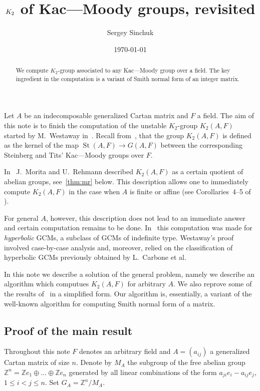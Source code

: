 \documentclass[oneside, 10pt]{amsart}
\title{$\K$ of Kac---Moody groups, revisited}
\author {Sergey Sinchuk}
\date {\today}
\theoremstyle{plain}
\theoremstyle{remark}
\theoremstyle{definition}
\DeclareMathOperator{\St}{St}
\newcommand{\ZZ}{\mathbb{Z}}
\newcommand{\K}{K_2}
\begin{document}
   
\begin{abstract} We compute $\K$-group associated to any Kac---Moody group over a field.
 The key ingredient in the computation is a variant of Smith normal form of an integer matrix.
\end{abstract}


\maketitle
Let $A$ be an indecomposable generalized Cartan matrix and $F$ a field.
The aim of this note is to finish the computation of the unstable $\K$-group $\K(A, F)$ started by M.~Westaway in~\cite{MW}.
Recall from~\cite{MR}, \cite{Ti} that the group $\K(A, F)$ is defined as the kernel of the map 
 $\St(A, F) \to G(A, F)$ between the corresponding Steinberg and Tits' Kac---Moody groups over $F$.

In~\cite{MR} J.~Morita and U.~Rehmann described $\K(A, F)$ as a certain quotient of abelian groups, see~\cref{thm:mr} below. 
This description allows one to immediately compute $\K(A, F)$ in the case when $A$ is finite or affine (see Corollaries~4--5 of \cite{MR}).

For general $A$, however, this description does not lead to an immediate answer and certain computation remains to be done.
In~\cite{MW} this computation was made for {\it hyperbolic} GCMs, a subclass of GCMs of indefinite type. 
Westaway's proof involved case-by-case analysis and, moreover, 
 relied on the classification of hyperbolic GCMs previously obtained by L.~Carbone et al.

In this note we describe a solution of the general problem, namely we describe an algorithm which computues $\K(A, F)$ for arbitrary $A$.
We also reprove some of the results of~\cite{MW} in a simplified form.
Our algorithm is, essentially, a variant of the well-known algorithm for computing Smith normal form of a matrix.


\subsection{Proof of the main result}
Throughout this note $F$ denotes an arbitrary field and $A=(a_{ij})$ a generalized Cartan matrix of size $n$.
Denote by $M_A$ the subgroup of the free abelian group $\ZZ^n = \ZZ e_1 \oplus \ldots \oplus \ZZ e_n $ generated by all 
 linear combinations of the form $a_{ji} e_i - a_{ij} e_j$, $1\leq i<j\leq n$.
Set $G_A = \ZZ^n/M_A$.
\end{document}
